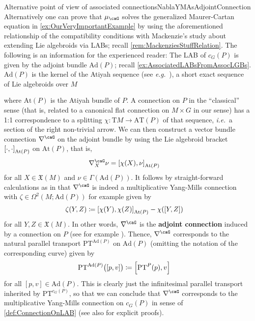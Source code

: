 \documentclass[reqno,a4paper,oneside]{amsart}
\newcommand\mutot{\mu_\caG}
\theoremstyle{plain}
\theoremstyle{remark}
\theoremstyle{definition}
\begin{document}
\begin{examples}{Alternative point of view of associated connections}{NablaYMAsAdjointConnection}
Alternatively one can prove that $\mutot$ solves the generalized Maurer-Cartan equation in \ref{ex:OurVeryImportantExample} by using the aforementioned relationship of the compatibility conditions with Mackenzie's study about extending Lie algebroids via LABs; recall \ref{rem:MackenziesStuffRelation}. The following is an information for the experienced reader: The LAB of $c_G(P)$ is given by the adjoint bundle $\mathrm{Ad}(P)$; recall \ref{ex:AssociatedLABsFromAssocLGBs}. $\mathrm{Ad}(P)$ is the kernel of the Atiyah sequence (see \textit{e.g.}\ \cite[\S 3.2, page 90ff.]{mackenzieGeneralTheory}), a short exact sequence of Lie algebroids over $M$
\begin{center}
\end{center}
where $\mathrm{At}(P)$ is the Atiyah bundle of $P$. A connection on $P$ in the ``classical'' sense (that is, related to a canonical flat connection on $M \times G$ in our sense) has a 1:1 correspondence to a splitting $\chi\colon \mathrm{T}M \to \mathrm{AT}(P)$ of that sequence, \textit{i.e.}\ a section of the right non-trivial arrow. We can then construct a vector bundle connection $\nabla^\caG$ on the adjoint bundle by using the Lie algebroid bracket $\mleft[ \cdot, \cdot \mright]_{\mathrm{At}(P)}$ on $\mathrm{At}(P)$, that is,
\begin{align*}
\nabla^\caG_X \nu
&=
\mleft[ \chi(X), \nu \mright]_{\mathrm{At}(P)}
\end{align*}
for all $X \in \mathfrak{X}(M)$ and $\nu \in \Gamma(\mathrm{Ad}(P))$. It follows by straight-forward calculations as in \cite[\S 7.3, Prop.\ 7.3.2 and Lemma 7.3.3, page 278]{mackenzieGeneralTheory} that $\nabla^\caG$ is indeed a multiplicative Yang-Mills connection with $\zeta \in \Omega^2(M;\mathrm{Ad}(P))$ for example given by 
\begin{align*}
\zeta(Y, Z)
&\coloneqq
\mleft[ \chi(Y), \chi(Z) \mright]_{\mathrm{At}(P)} - \chi([Y, Z])
\end{align*}
for all $Y, Z \in \mathfrak{X}(M)$. In other words, $\nabla^\caG$ is the \textbf{adjoint connection} induced by a connection on $P$ (see for example \cite[\S 5.3, especially Prop.\ 5.3.13, page 199]{mackenzieGeneralTheory}). Thence, $\nabla^\caG$ corresponds to the natural parallel transport $\mathrm{PT}^{\mathrm{Ad}(P)}$ on $\mathrm{Ad}(P)$ (omitting the notation of the corresponding curve) given by
\begin{align*}
\mathrm{PT}^{\mathrm{Ad}(P)}\bigl( [p, v] \bigr)
&\coloneqq
\mleft[ \mathrm{PT}^{P}(p), v \mright]
\end{align*}
for all $[p, v] \in \mathrm{Ad}(P)$. This is clearly just the infinitesimal parallel transport inherited by $\mathrm{PT}^{c_G(P)}$, so that we can conclude that $\nabla^\caG$ corresponds to the multiplicative Yang-Mills connection on $c_G(P)$ in sense of \ref{def:ConnectionOnLAB} (see also \cite{LAURENTGENGOUXStienonXuMultiplicativeForms} for explicit proofs).


\end{examples}
\end{document}
